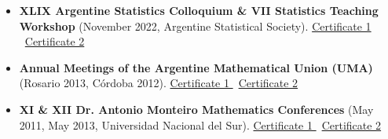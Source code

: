 \documentclass[english]{CV_template}
\begin{document}
\begin{itemize}
    \item \textbf{XLIX Argentine Statistics Colloquium \& VII Statistics Teaching Workshop} (November 2022, Argentine Statistical Society). \href{https://1drv.ms/b/s!Anr_tvZIYrhwidR37GyX8JbHkHBeGA?e=D9ooCM}{Certificate 1 {\footnotesize\faExternalLink}} \textbar\ \href{https://1drv.ms/b/s!Anr_tvZIYrhwidR4_kL8_XpkJeDw7w?e=JPBoeX}{Certificate 2 {\footnotesize\faExternalLink}}
    \item \textbf{Annual Meetings of the Argentine Mathematical Union (UMA)} (Rosario 2013, Córdoba 2012). \href{https://1drv.ms/b/s!Anr_tvZIYrhwgc9MosO5ebGk9rRf-w}{Certificate 1 {\footnotesize\faExternalLink}} \textbar\ \href{https://1drv.ms/u/s!Anr_tvZIYrhwgc8af6-T-A7NeXaSlw}{Certificate 2 {\footnotesize\faExternalLink}}
    \item \textbf{XI \& XII Dr. Antonio Monteiro Mathematics Conferences} (May 2011, May 2013, Universidad Nacional del Sur). \href{https://1drv.ms/b/s!Anr_tvZIYrhwgc9GYBGAGbHQCQqjzQ}{Certificate 1 {\footnotesize\faExternalLink}} \textbar\ \href{https://1drv.ms/u/s!Anr_tvZIYrhwgc8dRt9t2V22iKrg2g}{Certificate 2 {\footnotesize\faExternalLink}}
\end{itemize}
\end{document}
